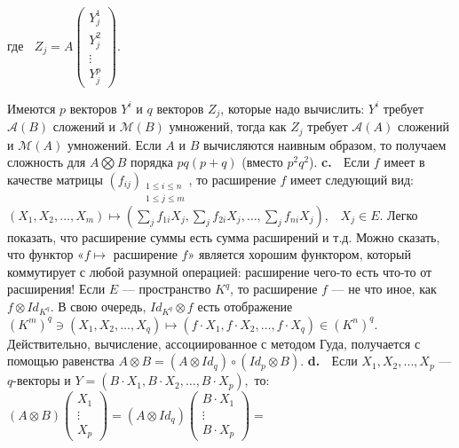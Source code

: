 \documentclass{../../template/mai_book}
\begin{document}
\begin{center}
где $\;\;Z_j = A\begin{pmatrix}
Y_j^1 \\
Y_j^2 \\
\vdots \\
Y_j^p
\end{pmatrix}.$
\end{center} 
Имеются $p$ векторов $Y^i$ и $q$ векторов $Z_j$, которые надо вычислить:
$Y^i$ требует $\mathcal{A}(B)$ сложений и $\mathcal{M}(B)$ умножений, тогда как $Z_j$ требует $\mathcal{A}(A)$ сложений и $\mathcal{M}(A)$ умножений. Если $A$ и $B$ вычисляются наивным образом, то получаем сложность для $A \bigotimes B$ порядка $pq(p + q)$ (вместо $p^2 q^2$). \newline \newline \indent
\textbf{c.} $\;$ Если $f$ имеет в качестве матрицы $(f_{ij})_{\substack{1 \le i \le n \\ 1 \le j \le m}}$, то расширение $f$ имеет следующий вид: 
\newline \newline \indent
$(X_1 , X_2 , \dots , X_m) \longmapsto (\sum \limits_{j} f_{1i} X_j , \sum \limits_{j} f_{2i} X_j , \dots , \sum \limits_{j} f_{ni} X_j), \;\;\; X_j \in E.$
\newline \newline \newline \newline
Легко показать, что расширение суммы есть сумма расширений и т.д. Можно сказать, что функтор «$f \longmapsto $ расширение $f$» является хорошим функтором, который коммутирует с любой разумной операцией: расширение чего-то есть что-то от расширения! Если $E$ --- пространство $K^q$, то расширение $f$ --- не что иное, как $f \otimes Id_{K^q}$. В свою очередь, $Id_{K^q} \otimes f$ есть отображение $(K^m)^q \ni (X_1 , X_2 , \dots , X_q) \longmapsto (f \cdot X_1 , f \cdot X_2 , \dots , f \cdot X_q) \in (K^n)^q$. Действительно, вычисление, ассоциированное с методом Гуда, получается с помощью равенства $A \otimes B = (A \otimes Id_q) \circ (Id_p \otimes B)$. \newline \newline \indent
\textbf{d.} $\;$ Если $X_1 , X_2 , \dots , X_p$ --- $q$-векторы и $Y = (B \cdot X_1 , B \cdot X_2 , \dots , B \cdot X_p),$
\newpage
\noindent
то: \newline \newline 
$(A \otimes B)\begin{pmatrix}
X_1 \\
\vdots \\
X_p
\end{pmatrix} = (A \otimes Id_q)\begin{pmatrix}
B \cdot X_1 \\
\vdots \\
B \cdot X_p
\end{pmatrix} =$ \newline \newline \newline \indent
\end{document}
